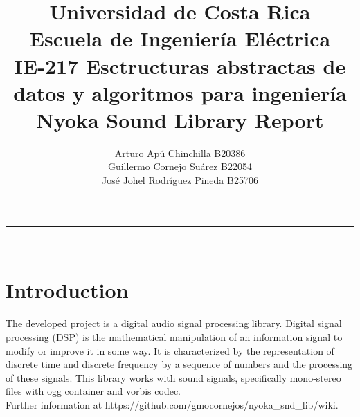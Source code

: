 \documentclass[letterpaper]{article}
\title{Universidad de Costa Rica \\ Escuela de Ingeniería Eléctrica \\ IE-217 Esctructuras abstractas de datos y algoritmos para ingeniería \\ Nyoka Sound Library Report}
\author{Arturo Apú Chinchilla B20386 \\ Guillermo Cornejo Suárez B22054 \\ José Johel Rodríguez Pineda B25706}
\begin{document}
\maketitle

\begin{center}
\rule{\textwidth}{0.8 pt} \\ [10 pt]
\end{center} 

\section{Introduction}

The developed project is a digital audio signal processing library. Digital signal processing (DSP) is the mathematical manipulation of an information signal to modify or improve it in some way. It is characterized by the representation of discrete time and discrete frequency by a sequence of numbers and the processing of these signals. This library works with sound signals, specifically mono-stereo files with ogg container and vorbis codec.\\
Further information at https://github.com/gmocornejos/nyoka\_snd\_lib/wiki.
\end{document}
